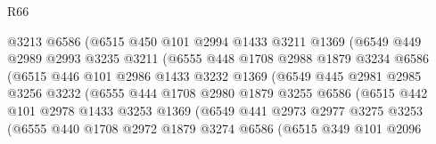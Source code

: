 \begin{lexlean}{R66}
\begin{coremodule}
                        @3213
                        @6586
                        (@6515
                          @450
                          @101
                          @2994
                          @1433
                          @3211
                          @1369
                          (@6549
                            @449
                            @2989
                            @2993
                            @3235
                            @3211
                            (@6555
                              @448
                              @1708
                              @2988
                              @1879
                              @3234
                              @6586
                              (@6515
                                @446
                                @101
                                @2986
                                @1433
                                @3232
                                @1369
                                (@6549
                                  @445
                                  @2981
                                  @2985
                                  @3256
                                  @3232
                                  (@6555
                                    @444
                                    @1708
                                    @2980
                                    @1879
                                    @3255
                                    @6586
                                    (@6515
                                      @442
                                      @101
                                      @2978
                                      @1433
                                      @3253
                                      @1369
                                      (@6549
                                        @441
                                        @2973
                                        @2977
                                        @3275
                                        @3253
                                        (@6555
                                          @440
                                          @1708
                                          @2972
                                          @1879
                                          @3274
                                          @6586
                                          (@6515
                                            @349
                                            @101
                                            @2096

\end{coremodule}
\end{lexlean}

